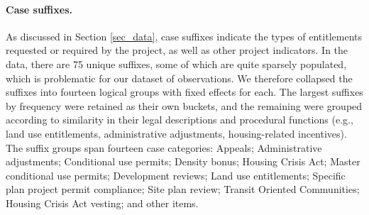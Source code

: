 \paragraph{Case suffixes.} As discussed in Section \ref{sec_data}, case suffixes indicate the types of entitlements requested or required by the project, as well as other project indicators. In the data, there are 75 unique suffixes, some of which are quite sparsely populated, which is problematic for our dataset of  observations. We therefore collapsed the suffixes into fourteen logical groups with fixed effects for each. The largest suffixes by frequency were retained as their own buckets, and the remaining were grouped according to similarity in their legal descriptions and procedural functions (e.g., land use entitlements, administrative adjustments, housing-related incentives). The suffix groups span fourteen case categories: Appeals; Administrative adjustments; Conditional use permits; Density bonus; Housing Crisis Act; Master conditional use permits; Development reviews; Land use entitlements; Specific plan project permit compliance; Site plan review; Transit Oriented Communities; Housing Crisis Act vesting; and other items.









